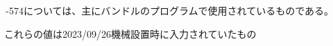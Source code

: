 \clearpage
\,-\ttNum574については、主にバンドルのプログラムで使用されているものである。
\begin{marker}
これらの値は2023/09/26機械設置時に入力されていたもの
\end{marker}

